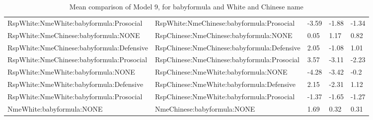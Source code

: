 \documentclass[]{report}
\begin{document}
\begin{table}[ht]
{\begin{tabular}{lllll}
		RspWhite:NmeWhite:babyformula:Prosocial  &  RspWhite:NmeChinese:babyformula:Prosocial & -3.59 & -1.88 & -1.34 \\ 
		RspWhite:NmeChinese:babyformula:NONE  &  RspChinese:NmeChinese:babyformula:NONE & 0.05 & 1.17 & 0.82 \\ 
		RspWhite:NmeChinese:babyformula:Defensive  &  RspChinese:NmeChinese:babyformula:Defensive & 2.05 & -1.08 & 1.01 \\ 
		RspWhite:NmeChinese:babyformula:Prosocial  &  RspChinese:NmeChinese:babyformula:Prosocial & 3.57 & -3.11 & -2.23 \\ 
		RspWhite:NmeWhite:babyformula:NONE  &  RspChinese:NmeWhite:babyformula:NONE & -4.28 & -3.42 & -0.2 \\ 
		RspWhite:NmeWhite:babyformula:Defensive  &  RspChinese:NmeWhite:babyformula:Defensive & 2.15 & -2.31 & 1.12 \\ 
		RspWhite:NmeWhite:babyformula:Prosocial  &  RspChinese:NmeWhite:babyformula:Prosocial & -1.37 & -1.65 & -1.27 \\ 
		NmeWhite:babyformula:NONE  &  NmeChinese:babyformula:NONE & 1.69 & 0.32 & 0.31 \\ 
		\hline
	\end{tabular}}
	\caption{Mean comparison of Model 9, for  babyformula  and White and Chinese name} 
\end{table}
\end{document}
